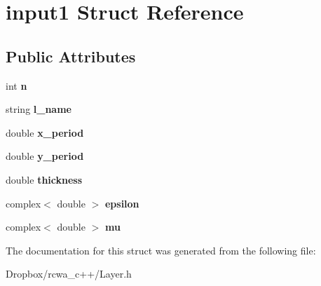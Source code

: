 \hypertarget{structinput1}{}\section{input1 Struct Reference}
\label{structinput1}
\subsection*{Public Attributes}
\begin{DoxyCompactItemize}
\item 
int {\bfseries n}\hypertarget{structinput1_aa789a4e98cad5451dc6bdf7a21d76ba4}{}\label{structinput1_aa789a4e98cad5451dc6bdf7a21d76ba4}

\item 
string {\bfseries l\+\_\+name}\hypertarget{structinput1_a8d6e6b7805f52d31a081daa757ba2eb2}{}\label{structinput1_a8d6e6b7805f52d31a081daa757ba2eb2}

\item 
double {\bfseries x\+\_\+period}\hypertarget{structinput1_a9da40c440297b1b8130903062bf6951b}{}\label{structinput1_a9da40c440297b1b8130903062bf6951b}

\item 
double {\bfseries y\+\_\+period}\hypertarget{structinput1_ad70e7f36c33baa5d40804e7d48c93b38}{}\label{structinput1_ad70e7f36c33baa5d40804e7d48c93b38}

\item 
double {\bfseries thickness}\hypertarget{structinput1_a5f03eb337427990a0c3ec5f9f866a313}{}\label{structinput1_a5f03eb337427990a0c3ec5f9f866a313}

\item 
complex$<$ double $>$ {\bfseries epsilon}\hypertarget{structinput1_af7a34f52d8a61bf87ed4d7a50e6b6ee5}{}\label{structinput1_af7a34f52d8a61bf87ed4d7a50e6b6ee5}

\item 
complex$<$ double $>$ {\bfseries mu}\hypertarget{structinput1_a2e5352f663cc589f10cc9b9337cc60aa}{}\label{structinput1_a2e5352f663cc589f10cc9b9337cc60aa}

\end{DoxyCompactItemize}


The documentation for this struct was generated from the following file\+:\begin{DoxyCompactItemize}
\item 
Dropbox/rcwa\+\_\+c++/Layer.\+h\end{DoxyCompactItemize}
